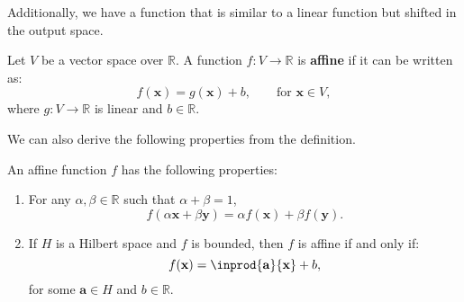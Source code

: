 \documentclass{huhtakm-template-book-v2}
\begin{document}
    Additionally, we have a function that is similar to a linear function but shifted in the output space.
    \begin{defn}
        Let $V$ be a vector space over $\mathbb{R}$. A function $f:V\to\mathbb{R}$ is \textbf{affine} if it can be written as:
        \begin{equation*}
            f(\mathbf{x})=g(\mathbf{x})+b, \qquad \text{for } \mathbf{x}\in V,
        \end{equation*}
        where $g:V\to\mathbb{R}$ is linear and $b\in\mathbb{R}$.
    \end{defn}
    We can also derive the following properties from the definition.
    \begin{thm}
        An affine function $f$ has the following properties:
        \begin{enumerate}
            \item For any $\alpha,\beta\in\mathbb{R}$ such that $\alpha+\beta=1$,
            \begin{equation*}
                f(\alpha\mathbf{x}+\beta\mathbf{y})=\alpha f(\mathbf{x})+\beta f(\mathbf{y}).
            \end{equation*}
            \item If $H$ is a Hilbert space and $f$ is bounded, then $f$ is affine if and only if:
            \begin{equation*}
                f(\mathbf{x}) = \inprod{\mathbf{a}}{\mathbf{x}}+b,
            \end{equation*}
            for some $\mathbf{a}\in H$ and $b\in\mathbb{R}$.
        \end{enumerate}
    \end{thm}
\end{document}
